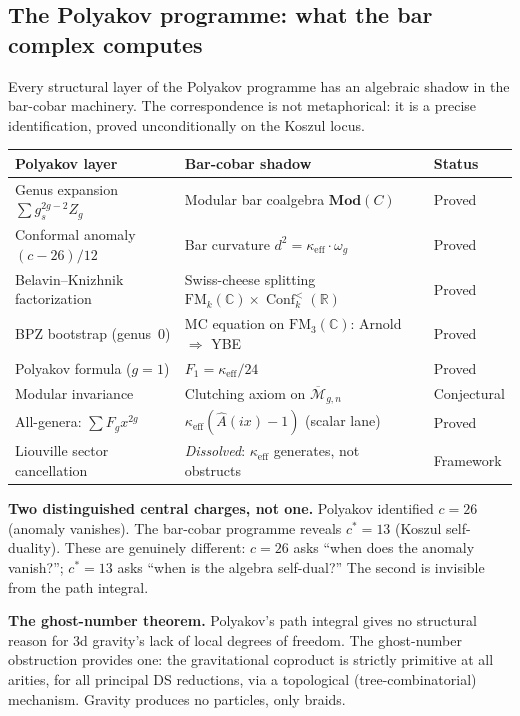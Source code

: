 \documentclass[11pt]{article}
\newcommand{\C}{\mathbb{C}}
\newcommand{\R}{\mathbb{R}}
\newcommand{\FM}{\mathrm{FM}}
\DeclareMathOperator{\Conf}{Conf}
\begin{document}
\subsection{The Polyakov programme: what the bar complex computes}
\label{subsec:polyakov-synthesis}

Every structural layer of the Polyakov programme has an algebraic
shadow in the bar-cobar machinery.  The correspondence is not
metaphorical: it is a precise identification, proved unconditionally
on the Koszul locus.

\begin{center}
\small\renewcommand{\arraystretch}{1.2}
\begin{tabular}{lll}
\textbf{Polyakov layer} & \textbf{Bar-cobar shadow} & \textbf{Status}
\\
\hline
Genus expansion $\sum g_s^{2g-2} Z_g$ &
  Modular bar coalgebra $\mathbf{Mod}(C)$ & Proved \\
Conformal anomaly $(c-26)/12$ &
  Bar curvature $d^2 = \kappa_{\mathrm{eff}} \cdot \omega_g$ &
  Proved \\
Belavin--Knizhnik factorization &
  Swiss-cheese splitting $\FM_k(\C) \times \Conf_k^{<}(\R)$ &
  Proved \\
BPZ bootstrap (genus~$0$) &
  MC equation on $\FM_3(\C)$: Arnold $\Rightarrow$ YBE &
  Proved \\
Polyakov formula ($g = 1$) &
  $F_1 = \kappa_{\mathrm{eff}}/24$ & Proved \\
Modular invariance &
  Clutching axiom on $\overline{\mathcal{M}}_{g,n}$ &
  Conjectural \\
All-genera: $\sum F_g x^{2g}$ &
  $\kappa_{\mathrm{eff}}(\hat{A}(ix)-1)$ (scalar lane) &
  Proved \\
Liouville sector cancellation &
  \emph{Dissolved}: $\kappa_{\mathrm{eff}}$ generates, not obstructs
  & Framework \\
\end{tabular}
\end{center}

\noindent\textbf{Two distinguished central charges, not one.}
Polyakov identified $c = 26$ (anomaly vanishes).  The bar-cobar
programme reveals $c^* = 13$ (Koszul self-duality).  These are
genuinely different: $c = 26$ asks ``when does the anomaly vanish?'';
$c^* = 13$ asks ``when is the algebra self-dual?''  The second is
invisible from the path integral.

\noindent\textbf{The ghost-number theorem.}  Polyakov's path integral
gives no structural reason for $3$d gravity's lack of local degrees
of freedom.  The ghost-number obstruction provides one: the
gravitational coproduct is strictly primitive at all arities, for
all principal DS reductions, via a topological (tree-combinatorial)
mechanism.  Gravity produces no particles, only braids.
\end{document}
